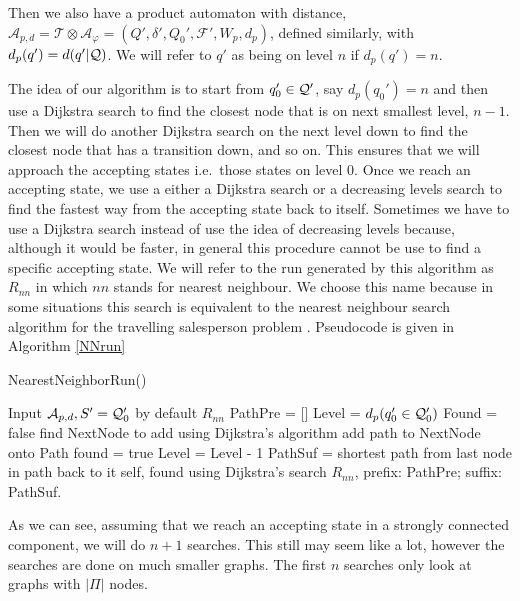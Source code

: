 Then we also have a product automaton with distance, $\mathcal{A}_{p,d} = \mathcal{T} \otimes \mathcal{A}_\varphi = (Q', \delta', Q_0', \mathcal{F}', W_p, d_p)$, defined similarly, with $d_p(q') = d(q'|\mathcal{Q})$. We will refer to $q'$ as being on level $n$ if $d_p(q') = n$.

The idea of our algorithm is to start from $q_0' \in \mathcal{Q}'$, say $d_p(q_0')=n$ and then use a Dijkstra search to find the closest node that is on next smallest level, $n-1$. Then we will do another Dijkstra search on the next level down to find the closest node that has a transition down, and so on. This ensures that we will approach the accepting states i.e.\ those states on level 0. Once we reach an accepting state, we use a either a Dijkstra search or a decreasing levels search to find the fastest way from the accepting state back to itself. Sometimes we have to use a Dijkstra search instead of use the idea of decreasing levels because, although it would be faster, in general this procedure cannot be use to find a specific accepting state. We will refer to the run generated by this algorithm as $R_{nn}$ in which $nn$ stands for nearest neighbour. We choose this name because in some situations this search is equivalent to the nearest neighbour search algorithm for the travelling salesperson problem \cite{hoffman86}. Pseudocode is given in Algorithm \ref{NNrun}

\begin{algorithm}
\caption{NearestNeighborRun()}\label{NNrun}
\begin{algorithmic}[1]
\Require Input $\mathcal{A}_{p,d}, S' = \mathcal{Q}_0'$ by default
\Ensure $R_{nn}$
\State PathPre = []
\State Level = $d_p(q_0' \in \mathcal{Q}_0')$
\State Found = false
\State find NextNode to add using Dijkstra's algorithm
\State	add path to NextNode onto Path
\State found = true
\Else 
\State Level = Level - 1	
\EndIf
\EndIf
\EndWhile
\State PathSuf = shortest path from last node in path back to it self, found using Dijkstra's search
\State $R_{nn}$, prefix: PathPre; suffix: PathSuf.
\end{algorithmic}
\end{algorithm}

As we can see, assuming that we reach an accepting state in a strongly connected component, we will do $n+1$ searches. This still may seem like a lot, however the searches are done on much smaller graphs. The first $n$ searches only look at graphs with $|\Pi|$ nodes. 

